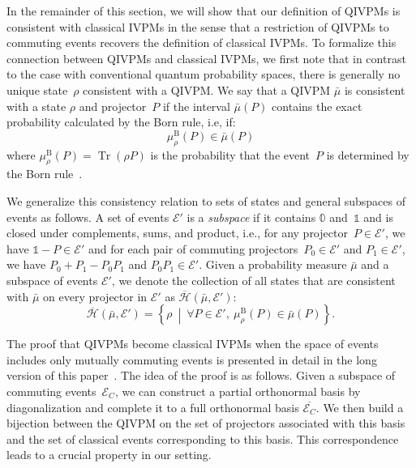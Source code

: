 \documentclass[english,reprint, aps, prl,superscriptaddress, showpacs,
showkeys, longbibliography, amsmath, amssymb, floatfix]{revtex4-1}
\theoremstyle{plain}
\theoremstyle{definition}
\newcommand{\Hilb}{\mathcal{H}}
\newcommand{\events}{\ensuremath{\mathcal{E}}}
\newcommand{\set}[2]{\ensuremath{\left\{ {#1}~\middle|~{#2}\right\} }}
\newcommand{\Tr}{\ensuremath{\mathop{\mathrm{Tr}}\nolimits}}
\newcommand{\coreBorn}{\ensuremath{\overline{\Hilb}}}
\begin{document}
In the remainder of this section, we will show that our definition of
QIVPMs is consistent with classical IVPMs in the sense that a
restriction of QIVPMs to commuting events recovers the definition of
classical IVPMs. To formalize this connection between QIVPMs and
classical IVPMs, we first note that in contrast to the case with
conventional quantum probability spaces, there is generally no unique
state~$\rho$ consistent with a QIVPM. We say that a QIVPM $\bar{\mu}$
is consistent with a state $\rho$ and projector~$P$ if the interval
$\bar{\mu}(P)$ contains the exact probability calculated by the Born
rule, i.e, if:
\begin{equation}
\mu_{\rho}^{\mathrm{B}}\left(P\right)\in\bar{\mu}\left(P\right)
\end{equation}
where $\mu_{\rho}^{\mathrm{B}}\left(P\right)=\Tr\left(\rho P\right)$
is the probability that the event~$P$ is determined by the Born
rule~\citep{Born1983,peres1995quantum,544199}.

We generalize this consistency relation to sets of states and general
subspaces of events as follows. A set of events $\events'$ is a
\emph{subspace} if it contains $\mathbb{0}$ and~$\mathbb{1}$ and is
closed under complements, sums, and product, i.e., for any projector~$P\in\events'$,
we have $\mathbb{1}-P\in\events'$ and for each pair of commuting
projectors~$P_{0}\in\events'$ and $P_{1}\in\events'$, we have $P_{0}+P_{1}-P_{0}P_{1}$
and $P_{0}P_{1}\in\events'$. Given a
probability measure $\bar{\mu}$ and a subspace of events $\events'$,
we denote the collection of all states that are consistent with
$\bar{\mu}$ on every projector in $\events'$ as
$\coreBorn(\bar{\mu},\events')$:
\begin{equation}
\label{eq:hbar}
\coreBorn\left(\bar{\mu},\events'\right)=\set{\rho}{\forall P\in \events',~\mu_{\rho}^{\mathrm{B}}\left(P\right)\in\bar{\mu}\left(P\right)}.
\end{equation}

The proof that QIVPMs become classical IVPMs when the space of events
includes only mutually commuting events is presented in detail in the
long version of this paper~\cite{HOSTunpublished}. The idea of the
proof is as follows. Given a subspace of commuting events~$\events_C$,
we can construct a partial orthonormal basis by diagonalization and
complete it to a full orthonormal basis $\overline{\events_C}$. We
then build a bijection between the QIVPM on the set of projectors
associated with this basis and the set of classical events
corresponding to this basis. This correspondence leads to a crucial
property in our setting.
\end{document}
